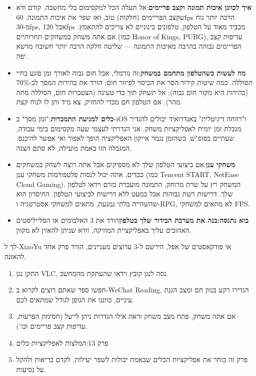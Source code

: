 \begin{itemize}
  \item \textbf{איך לכוונן איכות תמונה וקצב פריימים}:אל תעלה הכל למקסימום בלי מחשבה. קודם ודא שקצב הפריימים (חלקות) טוב, ואז שפר את איכות התמונה. 60fps הרבה יותר נוח מ-30fps, אבל 120fps מכביד מאוד על הטלפון, טלפונים בינוניים לא צריכים להתאמץ. אם אתה משחק במשחקים תחרותיים (כמו Honor of Kings, PUBG), עדיפות קצב הפריימים גבוהה בהרבה מאיכות התמונה — שליטה חלקה הרבה יותר חשובה מדשא יפה.
  \item \textbf{מה לעשות כשהטלפון מתחמם במשחק}:זה נורמלי, אבל חום גבוה לאורך זמן פוגע בחיי הסוללה. כמה שיטות קירור:הסר את הכיסוי לפיזור חום; הורד את בהירות המסך לכ-70\% (בהירות היא מקור חום גבוה); אל תשחק תוך כדי טעינה (הצטברות חום, הסוללה מתה מהר). אם הטלפון חם מכדי להחזיק, צא מיד ותן לו לנוח קצת.
  \item \textbf{כלים למניעת התמכרות}:"זמן מסך" ב-iOS ו"רווחה דיגיטלית" באנדרואיד יכולים להגדיר מגבלת זמן יומית לאפליקציות משחק. אני הגדרתי לעצמי שעה מקסימום בימי עבודה, שעתיים בסופ"ש. כשהזמן נגמר אייקון האפליקציה הופך לאפור ואי אפשר להיכנס. המגבלה הזו באמת מועילה, לא סתם הצגה.
  \item \textbf{משחקי ענן}:אם ביצועי הטלפון שלך לא מספיקים אבל אתה רוצה לשחק במשחקים כבדים, אתה יכול לנסות פלטפורמות משחקי ענן (כמו Tencent START, NetEase Cloud Gaming). המשחק רץ על שרת מרוחק, התמונה מועברת כזרם וידאו לטלפון שלך. דרישות רשת גבוהות אבל כמעט ללא דרישות לביצועי הטלפון. החיסרון הוא שהשהייה בלתי נמנעת, מתאים למשחקי אסטרטגיה ו-RPG, לא מתאים למשחקי FPS.
  \item \textbf{בוא נתנסה:בנה את מערכת הבידור שלך בטלפון}הורד את 3 האלבומים או הפלייליסטים האהובים עליך באפליקציית המוזיקה, וודא שניתן להאזין לא מקוון.
\end{itemize}

\begin{tcbpractice}{לך ל-XiaoYu או פודקאסטים של אפל, הירשם ל-3 ערוצים מעניינים, הורד פרק אחד להאזנה.}
\begin{enumerate}
  \item התקן נגן VLC, נסה לנגן קובץ וידאו שהעתקת מהמחשב.
  \item חפשו ספר שאתם רוצים לקרוא ב-WeChat Reading, הגדירו רקע בגוון חם ומצב הגנת עיניים, כווננו את הגופן לגודל שמתאים לכם.
  \item אם אתה משחק, פתח מצב משחק וראה אילו הגדרות ניתן לייעל (חסימת הפרעות, עדיפות קצב פריימים וכו').
  \item פרק 13:המלצות לאפליקציות כלים
  \item פרק זה בוחר את אפליקציות הכלים שבאמת יכולות לשפר יעילות, לקדם בריאות ולהקל על נסיעות.
\end{enumerate}

\end{tcbpractice}
